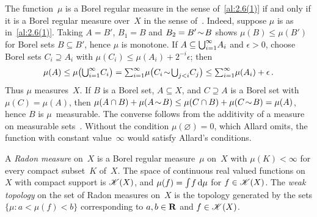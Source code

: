 \begin{remark}
    \label{rem:2.6(1)}
    The function~$\mu$ is a Borel regular measure in the sense of~\ref{al:2.6(1)} if and only if
    it is a Borel regular measure over~$X$ in the sense of~\cite[2.1.2, 2.2.3]{Federer1969}.
    Indeed, suppose $\mu$ is as in~\ref{al:2.6(1)}. Taking $A = B'$, $B_1 = B$ and $B_2 = B'
    \!\sim\! B$ shows $\mu(B) \le \mu(B')$ for Borel sets $B \subseteq B'$, hence $\mu$ is
    monotone. If $A \subseteq {{\textstyle \bigcup}}_{i=1}^\infty A_i$ and $\epsilon > 0$, choose Borel sets $C_i
    \supseteq A_i$ with $\mu(C_i) \le \mu(A_i) + 2^{-i} \epsilon$; then
    \begin{displaymath}
        \mu(A) \le \mu \big( {{\textstyle \bigcup}}_{i=1}^\infty C_i \big) = {\textstyle\sum_{i=1}^{\infty}} \mu \big( C_i
        \!\sim\! {{\textstyle \bigcup}}_{j<i} C_j \big) \le {\textstyle\sum_{i=1}^{\infty}} \mu(A_i) + \epsilon \,.
    \end{displaymath}
    Thus $\mu$ measures~$X$. If $B$ is a Borel set, $A \subseteq X$, and $C \supseteq A$ is
    a Borel set with $\mu(C) = \mu(A)$, then $\mu(A \cap B) + \mu(A \!\sim\! B) \le \mu(C \cap
    B) + \mu(C \!\sim\! B) = \mu(A)$, hence $B$ is $\mu$~measurable. The converse follows from
    the additivity of a measure on measurable sets~\cite[2.1.3]{Federer1969}. Without the
    condition $\mu(\varnothing) = 0$, which Allard omits, the function with constant
    value~$\infty$ would satisfy Allard's conditions.
\end{remark}

\begin{definition}
    \label{al:2.6(2)}
    A \emph{Radon measure} on~$X$ is a Borel regular measure~$\mu$ on~$X$ with $\mu(K) <
    \infty$ for every compact subset~$K$ of~$X$. The space of continuous real valued functions
    on~$X$ with compact support is $\mathscr{K}(X)$, and $\mu(f) = {\textstyle\int_{}^{}} f \,\mathrm{d} \mu$ for $f \in
    \mathscr{K}(X)$. The \emph{weak topology} on the set of Radon measures on~$X$ is the topology
    generated by the sets $\{ \mu : a < \mu(f) < b \}$ corresponding to $a, b \in \mathbf{R}$ and $f \in
    \mathscr{K}(X)$.
\end{definition}

